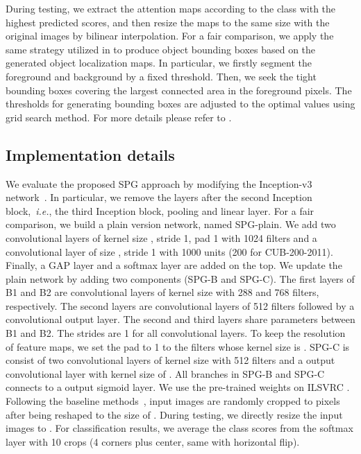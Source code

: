 \documentclass[runningheads]{llncs}
\newcommand{\ie}{\emph{i.e.}}
\begin{document}
During testing, we extract the attention maps according to the class with the highest predicted scores, and then resize the maps to the same size with the original images by bilinear interpolation.
For a fair comparison, we apply the same strategy utilized in \cite{zhou2015cnnlocalization} to produce object bounding boxes based on the generated object localization maps.
In particular, we firstly segment the foreground and background by a fixed threshold.
Then, we seek the tight bounding boxes covering the largest connected area in the foreground pixels.
The thresholds for generating bounding boxes are adjusted to the optimal values using grid search method.
For more details please refer to \cite{zhou2015cnnlocalization}.

\subsection{Implementation details}
We evaluate the proposed SPG approach by modifying the Inception-v3 network~\cite{szegedy2016rethinking}.
In particular, we remove the layers after the second Inception block,~\ie, the third Inception block, pooling and linear layer.
For a fair comparison, we build a plain version network, named SPG-plain.
We add two convolutional layers of kernel size , stride 1, pad 1 with 1024 filters and a convolutional layer of size , stride 1 with 1000 units (200 for CUB-200-2011).
Finally, a GAP layer and a softmax layer are added on the top.
We update the plain network by adding two components (SPG-B and SPG-C).
The first layers of B1 and B2 are convolutional layers of kernel size  with 288 and 768 filters, respectively.
The second layers are convolutional layers of 512 filters followed by a  convolutional output layer.
The second and third layers share parameters between B1 and B2.
The strides are 1 for all convolutional layers.
To keep the resolution of feature maps, we set the pad to 1 to the filters whose kernel size is .
SPG-C is consist of two convolutional layers of kernel size  with 512 filters and a output convolutional layer with kernel size of .
All branches in SPG-B and SPG-C connects to a output sigmoid layer.
We use the pre-trained weights on ILSVRC \cite{ILSVRC15}.
Following the baseline methods~\cite{zhou2015cnnlocalization,singh2017hide}, input images are randomly cropped to  pixels after being reshaped to the size of .
During testing, we directly resize the input images to .
For classification results, we average the class scores from the softmax layer with 10 crops (4 corners plus center, same with horizontal flip).
\end{document}
